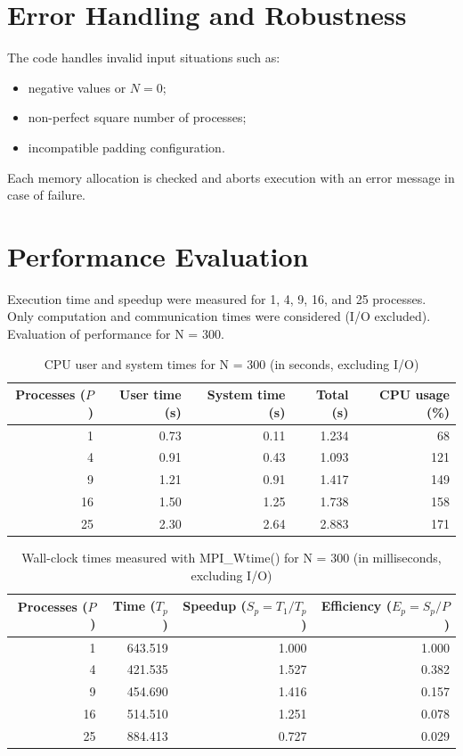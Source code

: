 \documentclass[10pt,a4paper]{article}
\begin{document}
\section{Error Handling and Robustness}
The code handles invalid input situations such as:
\begin{itemize}
  \item negative values or \(N = 0\);
  \item non-perfect square number of processes;
 \item incompatible padding configuration.
\end{itemize}
Each memory allocation is checked and aborts execution with an error message in case of failure.

\section{Performance Evaluation}
Execution time and speedup were measured for 1, 4, 9, 16, and 25 processes.  
Only computation and communication times were considered (I/O excluded). Evaluation of performance for N = 300.

\begin{table}[H]
\centering
\caption{CPU user and system times for N = 300 (in seconds, excluding I/O)}
\begin{tabular}{r r r r r}
\toprule
Processes ($P$) & User time (s) & System time (s) & Total (s) & CPU usage (\%) \\
\midrule
1  & 0.73 & 0.11 & 1.234 & 68 \\
4  & 0.91 & 0.43 & 1.093 & 121 \\
9  & 1.21 & 0.91 & 1.417 & 149 \\
16 & 1.50 & 1.25 & 1.738 & 158 \\
25 & 2.30 & 2.64 & 2.883 & 171 \\
\bottomrule
\end{tabular}
\end{table}

\begin{table}[H]
\centering
\caption{Wall-clock times measured with MPI\_Wtime() for N = 300 (in milliseconds, excluding I/O)}
\begin{tabular}{r r r r}
\toprule
Processes ($P$) & Time ($T_p$) & Speedup ($S_p = T_1 / T_p$) & Efficiency ($E_p = S_p / P$) \\
\midrule
1  & 643.519 & 1.000 & 1.000 \\
4  & 421.535 & 1.527 & 0.382 \\
9  & 454.690 & 1.416 & 0.157 \\
16 & 514.510 & 1.251 & 0.078 \\
25 & 884.413 & 0.727 & 0.029 \\
\bottomrule
\end{tabular}
\end{table}
\end{document}

